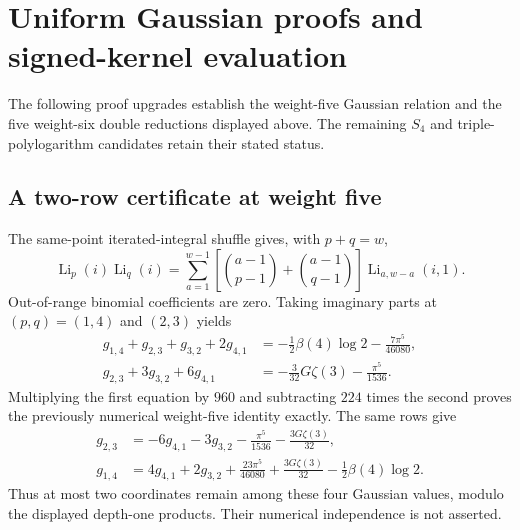 \section{Uniform Gaussian proofs and signed-kernel evaluation}
\label{gcc:section}
The following proof upgrades establish the weight-five Gaussian relation and
the five weight-six double reductions displayed above.  The remaining $S_4$
and triple-polylogarithm candidates retain their stated status.

\subsection{A two-row certificate at weight five}
The same-point iterated-integral shuffle gives, with $p+q=w$,
\begin{equation}\label{gcc:shuffle}
 \operatorname{Li}_p(i)\operatorname{Li}_q(i)
 =\sum_{a=1}^{w-1}
 \left[\binom{a-1}{p-1}+\binom{a-1}{q-1}\right]
 \operatorname{Li}_{a,w-a}(i,1).
\end{equation}
Out-of-range binomial coefficients are zero. Taking imaginary parts at
$(p,q)=(1,4)$ and $(2,3)$ yields
\begin{align}
 g_{1,4}+g_{2,3}+g_{3,2}+2g_{4,1}
 &=-\tfrac12\beta(4)\log2-\tfrac{7\pi^5}{46080},\label{gcc:R14}\\
 g_{2,3}+3g_{3,2}+6g_{4,1}
 &=-\tfrac{3}{32}G\zeta(3)-\tfrac{\pi^5}{1536}.\label{gcc:R23}
\end{align}
Multiplying the first equation by $960$ and subtracting $224$ times the second
proves the previously numerical weight-five identity exactly.  The same rows
give
\begin{align}
 g_{2,3}&=-6g_{4,1}-3g_{3,2}-\frac{\pi^5}{1536}
                         -\frac{3G\zeta(3)}{32},\label{gcc:g23}\\
 g_{1,4}&=4g_{4,1}+2g_{3,2}+\frac{23\pi^5}{46080}
       +\frac{3G\zeta(3)}{32}-\frac12\beta(4)\log2.
\end{align}
Thus at most two coordinates remain among these four Gaussian values, modulo
the displayed depth-one products.  Their numerical independence is not asserted.

